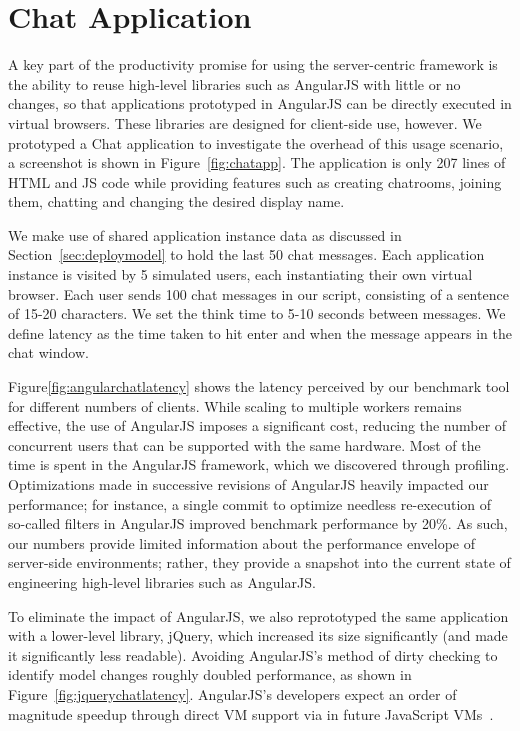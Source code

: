 \section{Chat Application} 

A key part of the productivity promise for using the server-centric \cb framework
is the ability to reuse high-level libraries such as AngularJS with little or
no changes, so that applications prototyped in AngularJS can be directly
executed in virtual browsers.  These libraries are designed for client-side
use, however.  We prototyped a Chat application to investigate the overhead
of this usage scenario, a screenshot is shown in Figure~\ref{fig:chatapp}.  
The application is only 207 lines of HTML and JS code while providing features such as 
creating chatrooms, joining them, chatting and changing the desired display name.

\chatroomfig{}

We make use of shared application instance data as discussed in Section~\ref{sec:deploymodel}
to hold the last 50 chat messages.  Each application instance is visited by 5 simulated users,
each instantiating their own virtual browser.  Each user sends 100 chat messages in our
script, consisting of a sentence of 15-20 characters.  We set the think time to 5-10 seconds
between messages.  We define latency as the time taken to hit enter and when the  message
appears in the chat window.

\angularchatlatency{}

Figure\ref{fig:angularchatlatency} shows the latency perceived by our benchmark tool
for different numbers of clients.  While scaling to multiple workers remains effective,
the use of AngularJS imposes a significant cost, reducing the number of concurrent users 
that can be supported with the same hardware.  Most of the time is spent in the AngularJS
framework, which we discovered through profiling.  Optimizations made in successive revisions
of AngularJS heavily impacted our performance; for instance, a single commit to optimize
needless re-execution of so-called filters in AngularJS improved benchmark performance by 20\%.
As such, our numbers provide limited information about the performance envelope of
server-side environments; rather, they provide a snapshot into the current state of
engineering high-level libraries such as AngularJS.  

\jquerychatlatency{}
To eliminate the impact of AngularJS, we also reprototyped the same application with a
lower-level library, jQuery, which increased its size significantly (and made it significantly
less readable).  Avoiding AngularJS's method of dirty checking to identify model changes
roughly doubled performance, as shown in Figure~\ref{fig:jquerychatlatency}.
AngularJS's developers expect an order of magnitude speedup through direct VM 
support via  in future JavaScript VMs~\cite{angularjsspeedup}.


